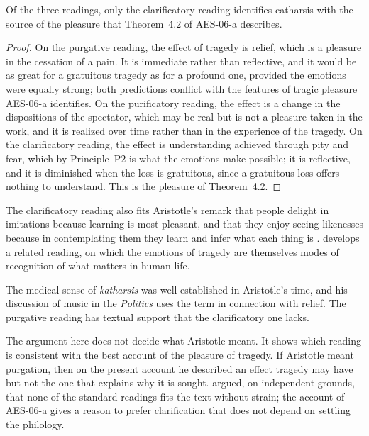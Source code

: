 \documentclass{situationist-preprint}
\begin{document}
\begin{proposition}\label{p:fit}
Of the three readings, only the clarificatory reading identifies catharsis with the source of the pleasure that Theorem~4.2 of AES-06-a describes.
\end{proposition}

\begin{proof}
On the purgative reading, the effect of tragedy is relief, which is a pleasure in the cessation of a pain. It is immediate rather than reflective, and it would be as great for a gratuitous tragedy as for a profound one, provided the emotions were equally strong; both predictions conflict with the features of tragic pleasure AES-06-a identifies. On the purificatory reading, the effect is a change in the dispositions of the spectator, which may be real but is not a pleasure taken in the work, and it is realized over time rather than in the experience of the tragedy. On the clarificatory reading, the effect is understanding achieved through pity and fear, which by Principle~P2 is what the emotions make possible; it is reflective, and it is diminished when the loss is gratuitous, since a gratuitous loss offers nothing to understand. This is the pleasure of Theorem~4.2.
\end{proof}

The clarificatory reading also fits Aristotle's remark that people delight in imitations because learning is most pleasant, and that they enjoy seeing likenesses because in contemplating them they learn and infer what each thing is \citep[1448b4--17]{Aristotle}. \citet{Nussbaum1986} develops a related reading, on which the emotions of tragedy are themselves modes of recognition of what matters in human life.

\begin{objection}[Philology]
The medical sense of \emph{katharsis} was well established in Aristotle's time, and his discussion of music in the \emph{Politics} uses the term in connection with relief. The purgative reading has textual support that the clarificatory one lacks.
\end{objection}

\begin{reply}
The argument here does not decide what Aristotle meant. It shows which reading is consistent with the best account of the pleasure of tragedy. If Aristotle meant purgation, then on the present account he described an effect tragedy may have but not the one that explains why it is sought. \citet{Lear1988} argued, on independent grounds, that none of the standard readings fits the text without strain; the account of AES-06-a gives a reason to prefer clarification that does not depend on settling the philology.
\end{reply}
\end{document}
